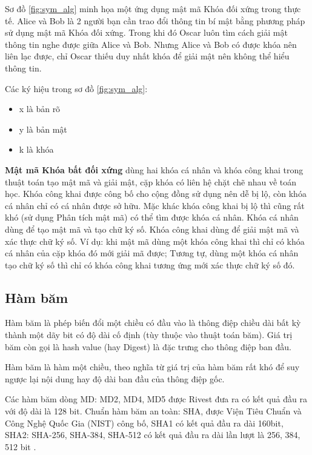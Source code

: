 Sơ đồ \ref{fig:sym_alg} minh họa một ứng dụng mật mã Khóa đối xứng trong thực tế\cite{10.5555/1721909}. Alice và Bob là 2 người bạn cần trao đổi thông tin bí mật bằng phương pháp sử dụng mật mã Khóa đối xứng. Trong khi đó Oscar luôn tìm cách giải mật thông tin nghe được giữa Alice và Bob. Nhưng Alice và Bob có được khóa nên liên lạc được, chỉ Oscar thiếu duy nhất khóa để giải mật nên không thể hiểu thông tin.

Các ký hiệu trong sơ đồ \ref{fig:sym_alg}:
\begin{itemize}
\item x là bản rõ
\item y là bản mật
\item k là khóa 
\end{itemize}

\textbf{Mật mã Khóa bất đối xứng} dùng hai khóa cá nhân và khóa công khai trong thuật toán tạo mật mã và giải mật, cặp khóa có liên hệ chặt chẽ nhau về toán học. Khóa công khai được công bố cho cộng đồng sử dụng nên dễ bị lộ, còn khóa cá nhân chỉ có cá nhân được sở hữu. Mặc khác khóa công khai bị lộ thì cũng rất khó (sử dụng Phân tích mật mã) có thể tìm được khóa cá nhân.
Khóa cá nhân dùng để tạo mật mã và tạo chữ ký số. Khóa công khai dùng để giải mật mã và xác thực chữ ký số. Ví dụ: khi mật mã dùng một khóa công khai thì chỉ có khóa cá nhân của cặp khóa đó mới giải mã được; Tương tự, dùng một khóa cá nhân tạo chữ ký số thì chỉ có khóa công khai tương ứng mới xác thực chữ ký số đó.

\subsection{Hàm băm}

Hàm băm là phép biến đổi một chiều có đầu vào là thông điệp chiều dài bất kỳ thành một dãy bit có độ dài cố định (tùy thuộc vào thuật toán băm). Giá trị băm còn gọi là hash value (hay Digest) là đặc trưng cho thông điệp ban đầu.

Hàm băm là hàm một chiều, theo nghĩa từ giá trị của hàm băm rất khó để suy ngược lại nội dung hay độ dài ban đầu của thông điệp gốc.

Các hàm băm dòng MD: MD2, MD4, MD5 được Rivest đưa ra có kết quả đầu ra với độ dài là 128 bit. Chuẩn hàm băm an toàn: SHA, được Viện Tiêu Chuẩn và Công Nghệ Quốc Gia (NIST) công bố, SHA1 có kết quả đầu ra dài 160bit, SHA2: SHA-256, SHA-384, SHA-512 có kết quả đầu ra dài lần lượt là 256, 384, 512 bit \cite{10.5555/1721909}.

